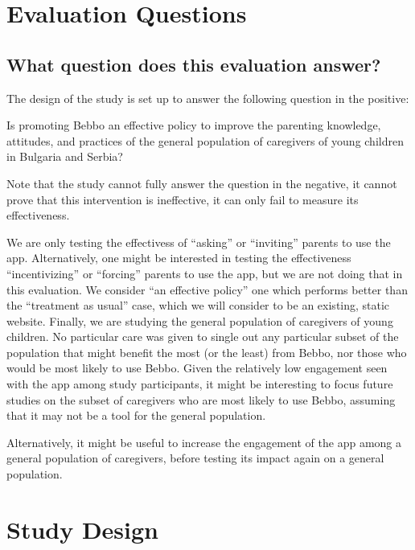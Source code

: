 \documentclass{article}
\begin{document}
\section{Evaluation Questions}

\subsection*{What question does this evaluation answer?}
The design of the study is set up to answer the following question in the positive:

\begin{displayquote}
Is promoting Bebbo an effective policy to improve the parenting knowledge, attitudes, and practices of the general population of caregivers of young children in Bulgaria and Serbia?
\end{displayquote}

\noindent Note that the study cannot fully answer the question in the negative, it cannot prove that this intervention is ineffective, it can only fail to measure its effectiveness.

We are only testing the effectivess of ``asking'' or ``inviting'' parents to use the app. Alternatively, one might be interested in testing the effectiveness ``incentivizing'' or ``forcing'' parents to use the app, but we are not doing that in this evaluation. We consider ``an effective policy'' one which performs better than the ``treatment as usual'' case, which we will consider to be an existing, static website. Finally, we are studying the general population of caregivers of young children. No particular care was given to single out any particular subset of the population that might benefit the most (or the least) from Bebbo, nor those who would be most likely to use Bebbo. Given the relatively low engagement seen with the app among study participants, it might be interesting to focus future studies on the subset of caregivers who are most likely to use Bebbo, assuming that it may not be a tool for the general population.

Alternatively, it might be useful to increase the engagement of the app among a general population of caregivers, before testing its impact again on a general population.


\section{Study Design}
\end{document}
